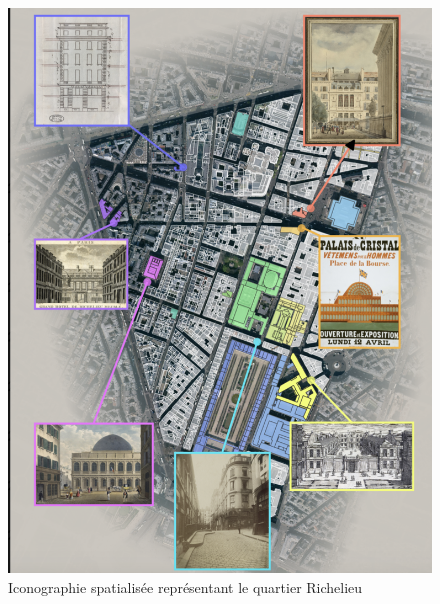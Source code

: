 \documentclass[11pt,french]{article}
\begin{document}
\clearpage
\begin{figure}[!p]
	\centering
	\includegraphics[width=\textwidth]{img/image2.png}
	\caption{Iconographie spatialisée représentant le quartier Richelieu}
	\label{fig:spatial}
\end{figure}
\end{document}
